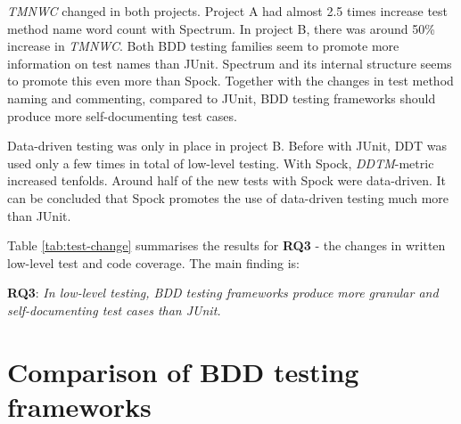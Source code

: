 \textit{TMNWC} changed in both projects. Project A had almost 2.5 times increase test method name word count with Spectrum. In
project B, there was around 50\% increase in \textit{TMNWC}. Both BDD testing families seem to promote more information on test
names than JUnit. Spectrum and its internal structure seems to promote this even more than Spock. Together with the changes
in test method naming and commenting, compared to JUnit, BDD testing frameworks should produce more self-documenting test cases.

Data-driven testing was only in place in project B. Before with JUnit, DDT was used only a few times in total
of low-level testing. With Spock, \textit{DDTM}-metric increased tenfolds. Around half of the new tests with Spock were data-driven.
It can be concluded that Spock promotes the use of data-driven testing much more than JUnit.

Table \ref{tab:test-change} summarises the results for \textbf{RQ3} - the changes in written low-level test and code coverage.
The main finding is:

\begin{center}
\begin{topbot}
\textbf{RQ3}: \textit{In low-level testing, BDD testing frameworks produce more granular and self-documenting test cases than JUnit.}
\end{topbot}
\end{center}

\section{Comparison of BDD testing frameworks}


